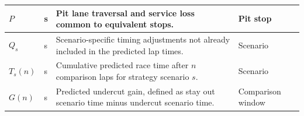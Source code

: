 \begin{table}[htbp]
\begin{tabular}{|l|l|p{7.5cm}|l|}
$P$ & s &
Pit lane traversal and service loss common to equivalent stops. &
Pit stop \\
\hline

$Q_s$ & s &
Scenario-specific timing adjustments not already included in the predicted lap times. &
Scenario \\
\hline

$T_s(n)$ & s &
Cumulative predicted race time after $n$ comparison laps for strategy scenario $s$. &
Scenario \\
\hline

$G(n)$ & s &
Predicted undercut gain, defined as stay out scenario time minus undercut scenario time. &
Comparison window \\
\hline

\end{tabular}
\end{table}
